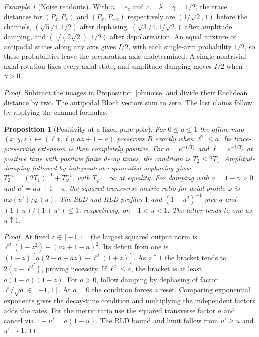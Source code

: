 \documentclass[aps,pra,onecolumn,superscriptaddress,nofootinbib,10pt]{revtex4-2}
\newtheorem{proposition}[theorem]{Proposition}
\theoremstyle{definition}
\theoremstyle{remark}
\newtheorem{example}[theorem]{Example}
\begin{document}
\begin{example}[Noise readouts]\label{ob:noisereadouts}
With $n=e_z$ and $c=\lambda=\gamma=1/2$, the trace distances for
$(P_z,P_x)$ and $(P_x,P_{-x})$ respectively are
$(1/\sqrt2,1)$ before the channels,
$(\sqrt5/4,1/2)$ after dephasing,
$(\sqrt3/4,1/\sqrt2)$ after amplitude damping, and
$(1/(2\sqrt2),1/2)$ after depolarization.
An equal mixture of antipodal states along any axis gives $I/2$,
with each single-arm probability $1/2$, so these probabilities leave
the preparation axis undetermined. A single nontrivial axial
rotation fixes every axial state, and amplitude damping moves $I/2$
when $\gamma>0$.
\end{example}
\begin{proof}
Subtract the images in Proposition~\ref{ob:noise} and divide their
Euclidean distance by two. The antipodal Bloch vectors sum to zero.
The last claims follow by applying the channel formulas.
\end{proof}

\begin{proposition}[Positivity at a fixed pure pole]\label{ob:pole}
For $0\le a\le1$ the affine map
$(x,y,z)\mapsto(\ell x,\ell y,az+1-a)$ preserves $B$ exactly when
$\ell^2\le a$. Its trace-preserving extension is then completely
positive. For $a=e^{-t/T_1}$ and $\ell=e^{-t/T_2}$ at positive time
with positive finite decay times, the condition is $T_2\le2T_1$.
Amplitude damping followed by independent exponential dephasing gives
$T_2^{-1}=(2T_1)^{-1}+T_\varphi^{-1}$, with $T_\varphi=\infty$ at equality.
For damping with $a=1-\gamma>0$ and $u'=au+1-a$, the squared
transverse metric ratio for axial profile $\varphi$ is
$a\varphi(u')/\varphi(u)$. The SLD and RLD profiles $1$ and
$(1-u^2)^{-1}$ give $a$ and $(1+u)/(1+u')\le1$, respectively,
on $-1<u<1$. The latter tends to one as $u\uparrow1$.
\end{proposition}
\begin{proof}
At fixed $z\in[-1,1]$ the largest squared output norm is
$\ell^2(1-z^2)+(az+1-a)^2$. Its deficit from one is
$(1-z)[a(2-a+az)-\ell^2(1+z)]$. As $z\uparrow1$ the bracket tends
to $2(a-\ell^2)$, proving necessity. If $\ell^2\le a$, the bracket
is at least $a(1-a)(1-z)$. For $a>0$, follow damping by dephasing
of factor $\ell/\sqrt a\in[-1,1]$. At $a=0$ the condition forces a reset.
Comparing exponential exponents gives the decay-time condition and
multiplying the independent factors adds the rates. For the metric
ratio use the squared transverse factor $a$ and cancel via
$1-u'=a(1-u)$. The RLD bound and limit follow from $u'\ge u$ and
$u'\to1$.
\end{proof}
\end{document}
